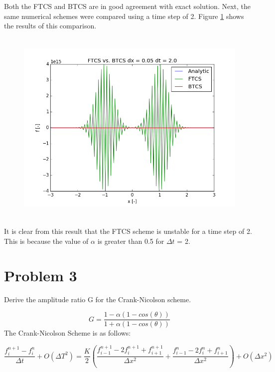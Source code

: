 \documentclass[12pt]{article}
\begin{document}
Both the FTCS and BTCS are in good agreement with exact solution. Next, the same numerical schemes were compared using a time step of 2. Figure \ref{fig:problem2b} shows the results of this comparison.

\begin{figure}[H]
	\centering
	\includegraphics[height=3.75in]{problem2b.png}
	\label{fig:problem2b}
\end{figure}

It is clear from this result that the FTCS scheme is unstable for a time step of 2. This is because the value of $\alpha$ is greater than 0.5 for $\Delta t$ = 2.



\section{Problem 3}
\noindent
Derive the amplitude ratio G for the Crank-Nicolson scheme.

\begin{equation}
G = \frac{1 - \alpha(1-cos(\theta))}{1 + \alpha(1-cos(\theta))}
\label{eqn:G_og}
\end{equation}
\noindent
The Crank-Nicolson Scheme is as follows:

\begin{equation}
	\frac{f_i^{n+1} - f_i^n}{\Delta t} + O(\Delta T^2) = \frac{K}{2} \left(\frac{f_{i-1}^{n+1} - 2f_i^{n+1} + f_{i+1}^{n+1}}{\Delta x^2} + \frac{f_{i-1}^n - 2f_i^n + f_{i+1}^n}{\Delta x^2}\right) + O(\Delta x^2) 
	\label{eqn:cn_scheme}
\end{equation}
\end{document}
